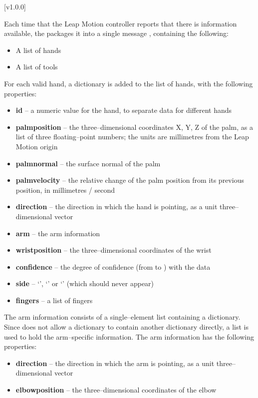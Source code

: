 [v1.0.0]

Each time that the Leap Motion controller reports that there is information available,
the  packages it into a single message
\openSq{}\closeSq, containing the following:
\begin{itemize}
\item A list of hands
\item A list of tools
\end{itemize}

For each valid hand, a dictionary \openSq{}\closeSq{} is added to the list
of hands, with the following properties:
\begin{itemize}
\item \textbf{id} -- a numeric value for the hand, to separate data for different hands
\item \textbf{palmposition} -- the three--dimensional coordinates \openSq{}X, Y,
Z\closeSq{} of the palm, as a list of three floating--point numbers; the units are
millimetres from the Leap Motion origin
\item \textbf{palmnormal} -- the surface normal of the palm
\item \textbf{palmvelocity} -- the relative change of the palm position from its previous
position, in millimetres / second
\item \textbf{direction} -- the direction in which the hand is pointing, as a unit
three--dimensional vector
\item \textbf{arm} -- the arm information
\item \textbf{wristposition} -- the three--dimensional coordinates of the wrist
\item \textbf{confidence} -- the degree of confidence (from  to ) with
the data
\item \textbf{side} -- `', `' or `' (which
should never appear)
\item \textbf{fingers} -- a list of fingers
\end{itemize}

The arm information consists of a single--element list containing a dictionary.
Since \yarp{} does not allow a dictionary to contain another dictionary directly, a list
is used to hold the arm--specific information.
The arm information has the following properties:
\begin{itemize}
\item \textbf{direction} -- the direction in which the arm is pointing, as a unit
three--dimensional vector
\item \textbf{elbowposition} -- the three--dimensional coordinates of the elbow
\end{itemize}

